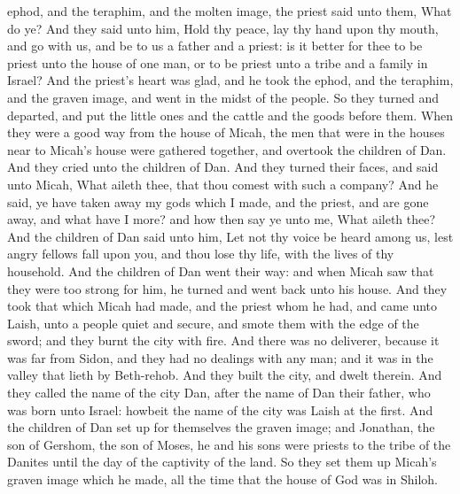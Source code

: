 ephod, and the teraphim, and the molten image, the priest said unto them, What do ye? And they said unto him, Hold thy peace, lay thy hand upon thy mouth, and go with us, and be to us a father and a priest: is it better for thee to be priest unto the house of one man, or to be priest unto a tribe and a family in Israel? And the priest’s heart was glad, and he took the ephod, and the teraphim, and the graven image, and went in the midst of the people.  So they turned and departed, and put the little ones and the cattle and the goods before them. When they were a good way from the house of Micah, the men that were in the houses near to Micah’s house were gathered together, and overtook the children of Dan. And they cried unto the children of Dan. And they turned their faces, and said unto Micah, What aileth thee, that thou comest with such a company? And he said, ye have taken away my gods which I made, and the priest, and are gone away, and what have I more? and how then say ye unto me, What aileth thee? And the children of Dan said unto him, Let not thy voice be heard among us, lest angry fellows fall upon you, and thou lose thy life, with the lives of thy household. And the children of Dan went their way: and when Micah saw that they were too strong for him, he turned and went back unto his house.  And they took that which Micah had made, and the priest whom he had, and came unto Laish, unto a people quiet and secure, and smote them with the edge of the sword; and they burnt the city with fire. And there was no deliverer, because it was far from Sidon, and they had no dealings with any man; and it was in the valley that lieth by Beth-rehob. And they built the city, and dwelt therein. And they called the name of the city Dan, after the name of Dan their father, who was born unto Israel: howbeit the name of the city was Laish at the first. And the children of Dan set up for themselves the graven image; and Jonathan, the son of Gershom, the son of Moses, he and his sons were priests to the tribe of the Danites until the day of the captivity of the land. So they set them up Micah’s graven image which he made, all the time that the house of God was in Shiloh. 

